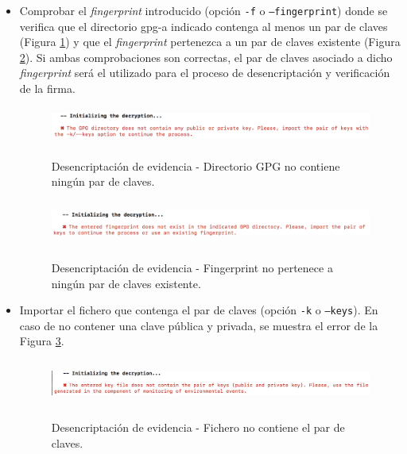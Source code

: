 \documentclass[12pt,a4paper, twoside]{report}
\begin{document}
	\begin{itemize}
		\item Comprobar el \textit{fingerprint} introducido (opción \texttt{-f} o \texttt{--fingerprint}) donde se verifica que el directorio \gls{gpg-a} indicado contenga al menos un par de claves (Figura \ref{fig:userguide_evidence_pairKeys}) y que el \textit{fingerprint} pertenezca a un par de claves existente (Figura \ref{fig:userguide_evidence_fingerprint}). Si ambas comprobaciones son correctas, el par de claves asociado a dicho \textit{fingerprint} será el utilizado para el proceso de desencriptación y verificación de la firma.
		
		\begin{figure}[!ht]   
			\caption{Desencriptación de evidencia - Directorio GPG no contiene ningún par de claves.} 
			\begin{center} 					\includegraphics[width=16cm,height=1.2cm]{Images/userGuide/evidence/pairKeys} \\
				\label{fig:userguide_evidence_pairKeys} 
			\end{center}  
		\end{figure}
		
		\begin{figure}[!ht]   
			\caption{Desencriptación de evidencia - Fingerprint no pertenece a ningún par de claves existente.} 
			\begin{center} 					\includegraphics[width=16cm,height=1.5cm]{Images/userGuide/evidence/fingerprint} \\
				\label{fig:userguide_evidence_fingerprint} 
			\end{center}  
		\end{figure}
		
		\newpage
		
		\item Importar el fichero que contenga el par de claves (opción \texttt{-k} o \texttt{--keys}). En caso de no contener una clave pública y privada, se muestra el error de la Figura \ref{fig:userguide_evidence_import}.
		
		\begin{figure}[!ht]   
			\caption{Desencriptación de evidencia - Fichero no contiene el par de claves.} 
			\begin{center} 					\includegraphics[width=16cm,height=1.5cm]{Images/userGuide/evidence/import} \\
				\label{fig:userguide_evidence_import} 
			\end{center}  
		\end{figure}
		
	\end{itemize}
\end{document}

